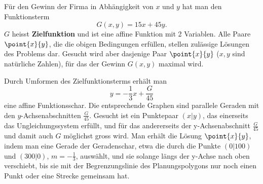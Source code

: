\documentclass[%
11pt,%
twoside,%
titlepage,%
german,%
headsepline%
]{scrartcl}
\begin{document}
\begin{bsp}
F\"ur den Gewinn der Firma in Abh\"angigkeit von $x$ und $y$ hat man den Funktionsterm
$$G(x,y)=15x+45y.$$
$G$ heisst \textbf{Zielfunktion} und ist eine affine Funktion mit 2 Variablen. Alle Paare $\point{x}{y}$, die die obigen Bedingungen erf\"ullen, stellen zul\"assige L\"osungen des Problems dar. Gesucht wird aber dasjenige Paar $\point{x}{y}$ ($x,y$ sind nat\"urliche Zahlen), f\"ur das der Gewinn $G(x,y)$ maximal wird.

Durch Umformen des Zielfunktionsterms erh\"alt man
$$y=-\frac{1}{3}x+\frac{G}{45}$$
eine affine Funktionsschar. Die entsprechende Graphen sind parallele Geraden mit den $y$-Achsenabschnitten $\frac{G}{45}$. Gesucht ist ein Punktepaar $(x|y)$, das einerseits das Ungleichungssystem erf\"ullt, und f\"ur das andererseits der y-Achsenabschnitt $\frac{G}{45}$ und damit auch $G$ m\"oglichst gross wird.
Man erh\"alt die L\"osung $\point{x}{y}$, indem man eine Gerade der Geradenschar, etwa die durch die Punkte $(0|100)$ und $(300|0)$, $m=-\frac{1}{3}$, ausw\"ahlt, und sie solange l\"angs der y-Achse nach oben verschiebt, bis sie mit der Begrenzungslinie des Planungspolygons nur noch einen Punkt oder eine Strecke gemeinsam hat.
\begin{figure}[h!]
\begin{center}
\end{center}
\end{figure}
\end{bsp}
\end{document}
